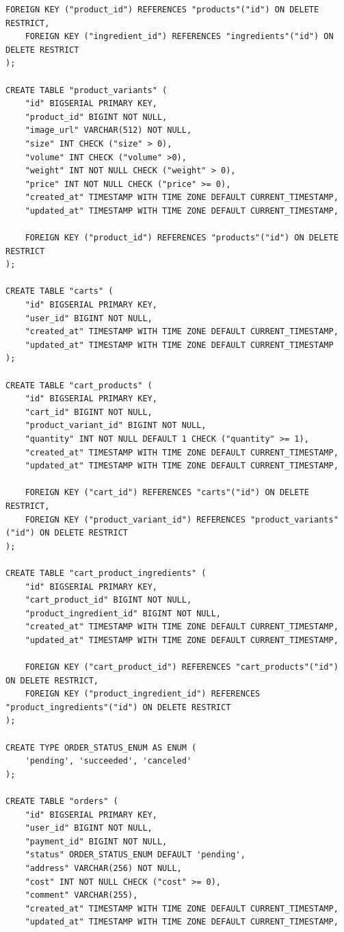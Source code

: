 \documentclass[a4paper,14pt]{extarticle}
\begin{document}
\begin{Verbatim}[tabsize=4,fontsize=\small]
    FOREIGN KEY ("product_id") REFERENCES "products"("id") ON DELETE RESTRICT,
    FOREIGN KEY ("ingredient_id") REFERENCES "ingredients"("id") ON DELETE RESTRICT
);

CREATE TABLE "product_variants" (
    "id" BIGSERIAL PRIMARY KEY,
    "product_id" BIGINT NOT NULL,
    "image_url" VARCHAR(512) NOT NULL,
    "size" INT CHECK ("size" > 0),
    "volume" INT CHECK ("volume" >0),
    "weight" INT NOT NULL CHECK ("weight" > 0),
    "price" INT NOT NULL CHECK ("price" >= 0),
    "created_at" TIMESTAMP WITH TIME ZONE DEFAULT CURRENT_TIMESTAMP,
    "updated_at" TIMESTAMP WITH TIME ZONE DEFAULT CURRENT_TIMESTAMP,

    FOREIGN KEY ("product_id") REFERENCES "products"("id") ON DELETE RESTRICT
);

CREATE TABLE "carts" (
    "id" BIGSERIAL PRIMARY KEY,
    "user_id" BIGINT NOT NULL,
    "created_at" TIMESTAMP WITH TIME ZONE DEFAULT CURRENT_TIMESTAMP,
    "updated_at" TIMESTAMP WITH TIME ZONE DEFAULT CURRENT_TIMESTAMP
);

CREATE TABLE "cart_products" (
    "id" BIGSERIAL PRIMARY KEY,
    "cart_id" BIGINT NOT NULL,
    "product_variant_id" BIGINT NOT NULL,
    "quantity" INT NOT NULL DEFAULT 1 CHECK ("quantity" >= 1),
    "created_at" TIMESTAMP WITH TIME ZONE DEFAULT CURRENT_TIMESTAMP,
    "updated_at" TIMESTAMP WITH TIME ZONE DEFAULT CURRENT_TIMESTAMP,

    FOREIGN KEY ("cart_id") REFERENCES "carts"("id") ON DELETE RESTRICT,
    FOREIGN KEY ("product_variant_id") REFERENCES "product_variants"("id") ON DELETE RESTRICT
);

CREATE TABLE "cart_product_ingredients" (
    "id" BIGSERIAL PRIMARY KEY,
    "cart_product_id" BIGINT NOT NULL,
    "product_ingredient_id" BIGINT NOT NULL,
    "created_at" TIMESTAMP WITH TIME ZONE DEFAULT CURRENT_TIMESTAMP,
    "updated_at" TIMESTAMP WITH TIME ZONE DEFAULT CURRENT_TIMESTAMP,

    FOREIGN KEY ("cart_product_id") REFERENCES "cart_products"("id") ON DELETE RESTRICT,
    FOREIGN KEY ("product_ingredient_id") REFERENCES "product_ingredients"("id") ON DELETE RESTRICT
);

CREATE TYPE ORDER_STATUS_ENUM AS ENUM (
    'pending', 'succeeded', 'canceled'
);

CREATE TABLE "orders" (
    "id" BIGSERIAL PRIMARY KEY,
    "user_id" BIGINT NOT NULL,
    "payment_id" BIGINT NOT NULL,
    "status" ORDER_STATUS_ENUM DEFAULT 'pending',
    "address" VARCHAR(256) NOT NULL,
    "cost" INT NOT NULL CHECK ("cost" >= 0),
    "comment" VARCHAR(255),
    "created_at" TIMESTAMP WITH TIME ZONE DEFAULT CURRENT_TIMESTAMP,
    "updated_at" TIMESTAMP WITH TIME ZONE DEFAULT CURRENT_TIMESTAMP,


\end{Verbatim}
\end{document}
